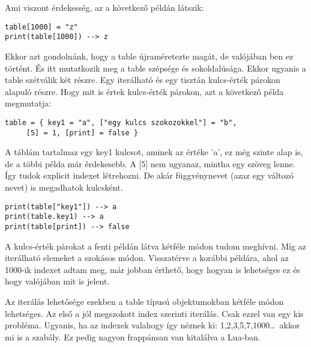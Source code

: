 Ami viszont érdekesség, az a következő példán látszik:
\scriptsize
\begin{lstlisting}
table[1000] = "z"
print(table[1000]) --> z
\end{lstlisting}
\normalsize
Ekkor azt gondolnánk, hogy a table újraméretezte magát, de valójában ben ez történt. És itt mutatkozik meg a table szépsége és sokoldalúsága. Ekkor ugyanis a table szétválik két részre. Egy iterálható és egy tisztán kulcs-érték párokon alapuló részre. Hogy mit is értek kulcs-érték párokon, azt a következő példa megmutatja:
\scriptsize
\begin{lstlisting}
table = { key1 = "a", ["egy kulcs szokozokkel"] = "b",
	 [5] = 1, [print] = false }
\end{lstlisting}
\normalsize
A táblám tartalmaz egy key1 kulcsot, aminek az értéke 'a', ez még szinte alap is, de a többi példa már érdekesebb. A [5] nem ugyanaz, mintha egy szöveg lenne. Így tudok explicit indexet létrehozni. De akár függvénynevet (azaz egy változó nevet) is megadhatok kulcsként.
\scriptsize
\begin{lstlisting}
print(table["key1"]) --> a
print(table.key1) --> a
print(table[print]) --> false
\end{lstlisting}
\normalsize
A kulcs-érték párokat a fenti példán látva kétféle módon tudom meghívni. Míg az iterálható elemeket a szokásos módon. Visszatérve a korábbi példára, ahol az 1000-ik indexet adtam meg, már jobban érthető, hogy hogyan is lehetséges ez és hogy valójában mit is jelent. 

Az iterálás lehetősége ezekben a table típusú objektumokban kétféle módon lehetséges. Az első a jól megszokott index szerinti iterálás. Csak ezzel van egy kis probléma. Ugyanis, ha az indexek valahogy így néznek ki: 1,2,3,5,7,1000\dots~akkor mi is a szabály. Ez pedig nagyon frappánsan van kitalálva a Lua-ban. 

